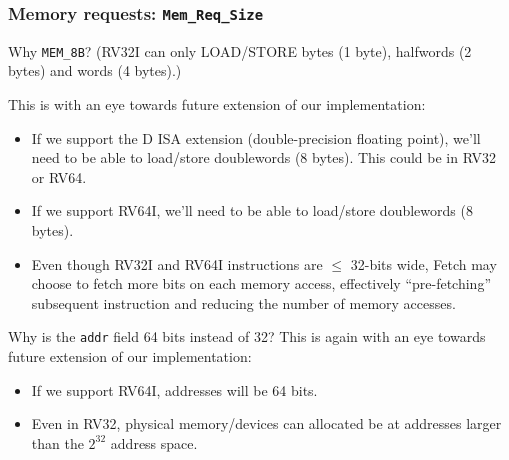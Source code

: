 \begin{frame}[fragile]
\frametitle{Memory requests: {\tt Mem\_Req\_Size}}

\footnotesize


\PAUSE{\vspace{2ex}}

Why {\tt MEM\_8B}?  (RV32I can only LOAD/STORE bytes (1 byte),
halfwords (2 bytes) and words (4 bytes).)

\PAUSE{\vspace{1ex}}

This is with an eye towards future extension of our implementation:

\begin{itemize}

 \item If we support the D ISA extension (double-precision floating
       point), we'll need to be able to load/store doublewords (8 bytes).
       This could be in RV32 or RV64.

 \item If we support RV64I, we'll need to be able to load/store
       doublewords (8 bytes).

 \PAUSE{\vspace{2ex}}

 \item Even though RV32I and RV64I instructions are $\leq$ 32-bits
       wide, Fetch may choose to fetch more bits on each memory
       access, effectively ``pre-fetching'' subsequent instruction and
       reducing the number of memory accesses.

\end{itemize}

\PAUSE{\vspace{2ex}}

Why is the {\tt addr} field 64 bits instead of 32?  This is again with
an eye towards future extension of our implementation:

\begin{itemize}

 \item If we support RV64I, addresses will be 64 bits.

 \PAUSE{\vspace{1ex}}

 \item Even in RV32, physical memory/devices can allocated be at
       addresses larger than the $2^{32}$ address space.

\end{itemize}

\end{frame}

